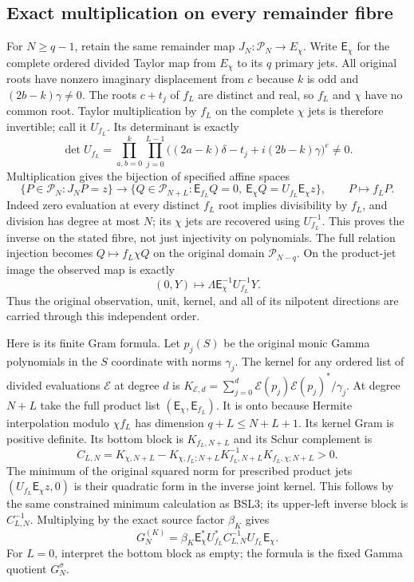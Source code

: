 \subsection{Exact multiplication on every remainder fibre}
For $N\geq q-1$, retain the same remainder map
$J_N:\mathcal P_N\to E_\chi$. Write $\mathsf E_\chi$ for the complete
ordered divided Taylor map from $E_\chi$ to its $q$ primary jets.
All original roots have nonzero imaginary displacement from $c$
because $k$ is odd and $(2b-k)\gamma\ne0$. The roots $c+t_j$ of
$f_L$ are distinct and real, so $f_L$ and $\chi$ have no common root.
Taylor multiplication by $f_L$ on the complete $\chi$ jets is therefore
invertible; call it $U_{f_L}$. Its determinant is exactly
\[
 \det U_{f_L}=\prod_{a,b=0}^{k}\prod_{j=0}^{L-1}
 \big((2a-k)\delta-t_j+i(2b-k)\gamma\big)^e\ne0.
 \tag{IKO6}
\]
Multiplication gives the bijection of specified affine spaces
\[
 \{P\in\mathcal P_N:J_NP=z\}\longrightarrow
 \{Q\in\mathcal P_{N+L}:\mathsf E_{f_L}Q=0,
                \ \mathsf E_\chi Q=U_{f_L}\mathsf E_\chi z\},
 \qquad P\longmapsto f_LP.
 \tag{IKO7}
\]
Indeed zero evaluation at every distinct $f_L$ root implies
divisibility by $f_L$, and division has degree at most $N$; its
$\chi$ jets are recovered using $U_{f_L}^{-1}$. This proves the
inverse on the stated fibre, not just injectivity on polynomials.
The full relation injection becomes
$Q\mapsto f_L\chi Q$ on the original domain $\mathcal P_{N-q}$.
On the product-jet image the observed map is exactly
\[
 (0,Y)\longmapsto\Lambda\mathsf E_\chi^{-1}U_{f_L}^{-1}Y.
 \tag{IKO8}
\]
Thus the original observation, unit, kernel, and all of its nilpotent
directions are carried through this independent order.

Here is its finite Gram formula. Let $p_j(S)$ be the original monic
Gamma polynomials in the $S$ coordinate with norms $\gamma_j$.
The kernel for any ordered list of divided evaluations $\mathcal E$
at degree $d$ is
$K_{\mathcal E,d}=\sum_{j=0}^d
\mathcal E(p_j)\mathcal E(p_j)^*/\gamma_j$.
At degree $N+L$ take the full product list $(\mathsf E_\chi,
\mathsf E_{f_L})$. It is onto because Hermite interpolation modulo
$\chi f_L$ has dimension $q+L\leq N+L+1$. Its kernel Gram is
positive definite. Its bottom block is $K_{f_L,N+L}$ and its Schur
complement is
\[
 C_{L,N}=K_{\chi,N+L}-K_{\chi,f_L;N+L}
 K_{f_L,N+L}^{-1}K_{f_L,\chi;N+L}>0.
\]
The minimum of the original squared norm for prescribed product jets
$(U_{f_L}\mathsf E_\chi z,0)$ is their quadratic form in the inverse
joint kernel. This follows by the same constrained minimum calculation
as BSL3; its upper-left inverse block is $C_{L,N}^{-1}$.
Multiplying by the exact source factor $\beta_K$ gives
\[
 G_N^{(K)}=\beta_K\mathsf E_\chi^*U_{f_L}^*
                       C_{L,N}^{-1}U_{f_L}\mathsf E_\chi.
 \tag{IKO9}
\]
For $L=0$, interpret the bottom block as empty; the formula is the
fixed Gamma quotient $G_N^\sigma$.

